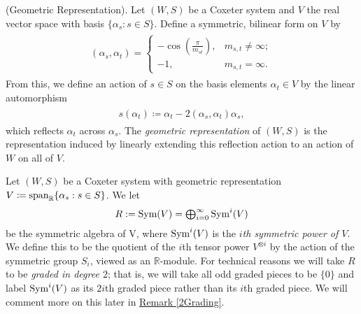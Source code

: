 \noindent\begin{definition}\label{GeometricRepresentation}\textnormal{(Geometric Representation).} Let $(W, S)$ be a Coxeter system and $V$ the real vector space with basis $\{\alpha_s : s \in S\}$. Define a symmetric, bilinear form on $V$ by%
\begin{align*}
\begin{split}
(\alpha_s, \alpha_t) = \begin{cases}-\cos\!\left(\frac{\pi}{m_{st}}\right)\!,&m_{s,t} \neq \infty;\\-1,&m_{s,t} = \infty.\end{cases}
\end{split}
\end{align*}
\noindent From this, we define an action of $s \in S$ on the basis elements $\alpha_t \in V$ by the linear automorphism
\begin{align*}
\begin{split}
s(\alpha_t) \coloneqq \alpha_t - 2(\alpha_s, \alpha_t)\alpha_s,
\end{split}
\end{align*}
\noindent which reflects $\alpha_t$ across $\alpha_s$. The {\em geometric representation} of $(W, S)$ is the representation induced by linearly extending this reflection action to an action of $W$ on all of $V$.\\
\end{definition}

\noindent Let $(W, S)$ be a Coxeter system with geometric representation $V \coloneqq \textnormal{span}_\mathbb{R}\{\alpha_s : s \in S\}$. We let
\begin{align*}
\begin{split}
\textstyle{R := \textnormal{Sym}(V) = \bigoplus_{i=0}^\infty \textnormal{Sym}^i(V)}
\end{split}
\end{align*}
be the symmetric algebra of V, where $\textnormal{Sym}^i(V)$ is the {\em $i$th symmetric power of $V$}. We define this to be the quotient of the $i$th tensor power $V^{\otimes i}$ by the action of the symmetric group $S_i$, viewed as an $\mathbb{R}$-module. For technical reasons we will take $R$ to be {\em graded in degree $2$}; that is, we will take all odd graded pieces to be $\{0\}$ and label $\textnormal{Sym}^i(V)$ as its $2i$th graded piece rather than its $i$th graded piece. We will comment more on this later in \hyperref[2Grading]{Remark \ref*{2Grading}}.\\

